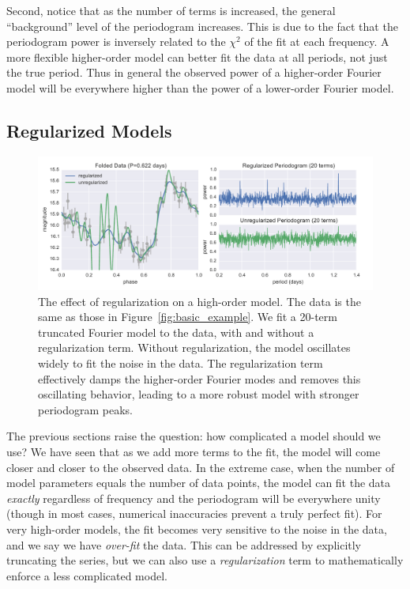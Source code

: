 \documentclass{emulateapj}
\newcommand{\Fig}[1]{Figure~\ref{fig:#1}}
\newcommand{\fig}[1]{\Fig{#1}}
\newcommand{\figlabel}[1]{\label{fig:#1}}
\newcommand{\sectlabel}[1]{\label{sect:#1}}
\begin{document}
Second, notice that as the number of terms is increased, the general ``background'' level of the periodogram increases. This is due to the fact that the periodogram power is inversely related to the $\chi^2$ of the fit at each frequency. A more flexible higher-order model can better fit the data at all periods, not just the true period. Thus in general the observed power of a higher-order Fourier model will be everywhere higher than the power of a lower-order Fourier model.

\subsection{Regularized Models}
\sectlabel{regularization}

\begin{figure}
  \centering
  \includegraphics[width=\textwidth]{fig04.pdf}
  \caption{
    The effect of regularization on a high-order model. The data is the same as
    those in \fig{basic_example}. We fit a 20-term truncated Fourier model to
    the data, with and without a regularization term. Without regularization,
    the model oscillates widely to fit the noise in the data. The
    regularization term effectively damps the higher-order Fourier modes and
    removes this oscillating behavior, leading to a more robust model with
    stronger periodogram peaks.
  }
  \figlabel{regularized_example}
\end{figure}

The previous sections raise the question: how complicated a model should we use? We have seen that as we add more terms to the fit, the model will come closer and closer to the observed data.  In the extreme case, when the number of model parameters equals the number of data points, the model can fit the data {\it exactly} regardless of frequency and the periodogram will be everywhere unity (though in most cases, numerical inaccuracies prevent a truly perfect fit). For very high-order models, the fit becomes very sensitive to the noise in the data, and we say we have {\it over-fit} the data. This can be addressed by explicitly truncating the series, but we can also use a {\it regularization} term to mathematically enforce a less complicated model.
\end{document}
